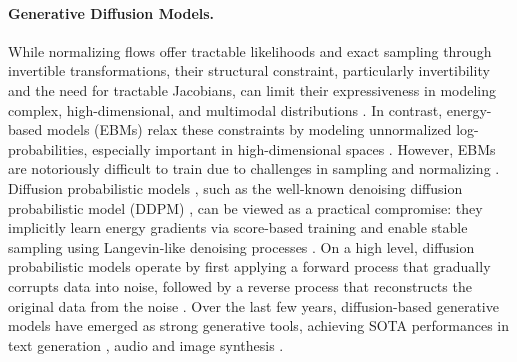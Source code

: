 \documentclass[a4paper,oneside,bibliography=totoc]{scrbook}
\begin{document}
\paragraph{Generative Diffusion Models.}
While normalizing flows offer tractable likelihoods and exact sampling through invertible transformations, their structural constraint, particularly invertibility and the need for tractable Jacobians, can limit their expressiveness in modeling complex, high-dimensional, and multimodal distributions \cite{benidis_deep_2022}. 
In contrast, energy-based models (EBMs) relax these constraints by modeling unnormalized log-probabilities, especially important in high-dimensional spaces \cite{lecun_tutorial_2006}. 
However, EBMs are notoriously difficult to train due to challenges in sampling and normalizing \cite{du_implicit_2019}. 
Diffusion probabilistic models \cite{ho_denoising_2020, sohl-dickstein_deep_2015, graikos_diffusion_2022}, such as the well-known denoising diffusion probabilistic model (DDPM) \cite{ho_denoising_2020}, can be viewed as a practical compromise: they implicitly learn energy gradients via score-based training \cite{hyvarinen_estimation_2005, song_maximum_2021} and enable stable sampling using Langevin-like denoising processes \cite{neal_mcmc_2011, welling_bayesian_2011}. 
On a high level, diffusion probabilistic models operate by first applying a forward process that gradually corrupts data into noise, followed by a reverse process that reconstructs the original data from the noise \cite{ho_denoising_2020}.
Over the last few years, diffusion-based generative models have emerged as strong generative tools, achieving SOTA performances in text generation \cite{li_diffusion-lm_2022}, audio \cite{kong_diffwave_2020} and image synthesis \cite{dhariwal_diffusion_2021}.
\end{document}
